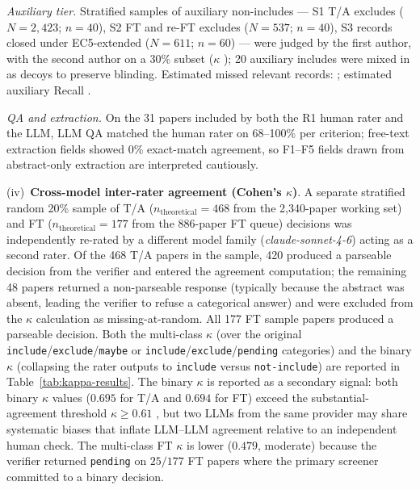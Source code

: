 \emph{Auxiliary tier.} Stratified samples of auxiliary non-includes ---
S1 T/A excludes ($N=2{,}423$; $n=40$), S2 FT and re-FT excludes ($N=537$;
$n=40$), S3 records closed under EC5-extended ($N=611$; $n=60$) --- were
judged by the first author, with the second author on a 30\% subset
($\kappa$ ); 20 auxiliary includes were mixed in as decoys to
preserve blinding. Estimated missed relevant records: ;
estimated auxiliary Recall . 

\emph{QA and extraction.} On the 31 papers included by both the R1 human
rater and the LLM, LLM QA matched the human rater on 68--100\% per
criterion; free-text extraction fields showed 0\% exact-match agreement, so
F1--F5 fields drawn from abstract-only extraction are interpreted
cautiously.




(iv)~\textbf{Cross-model inter-rater agreement (Cohen's $\kappa$)}.
A separate stratified random 20\% sample of T/A ($n_{\text{theoretical}} = 468$ from
the 2{,}340-paper working set) and FT ($n_{\text{theoretical}} = 177$ from
the 886-paper FT queue) decisions was independently re-rated by a different
model family (\textit{claude-sonnet-4-6}) acting as a second rater. Of the
468 T/A papers in the sample, 420 produced a parseable decision from the
verifier and entered the agreement computation; the remaining 48 papers
returned a non-parseable response (typically because the abstract was
absent, leading the verifier to refuse a categorical answer) and were
excluded from the $\kappa$ calculation as missing-at-random. All 177 FT
sample papers produced a parseable decision. Both the multi-class
$\kappa$ (over the original \texttt{include}/\texttt{exclude}/\texttt{maybe}
or \texttt{include}/\texttt{exclude}/\texttt{pending} categories) and the
binary $\kappa$ (collapsing the rater outputs to
\texttt{include} versus \texttt{not-include}) are reported in
Table~\ref{tab:kappa-results}. The binary $\kappa$ is reported as a
secondary signal: both binary $\kappa$ values ($0.695$ for T/A and $0.694$
for FT) exceed the substantial-agreement threshold $\kappa \geq 0.61$
\cite{landiskoch1977}, but two LLMs from the same provider may share
systematic biases that inflate LLM--LLM agreement relative to an independent
human check. The multi-class FT $\kappa$ is lower ($0.479$, moderate)
because the verifier returned \texttt{pending} on $25/177$ FT papers where
the primary screener committed to a binary decision.

